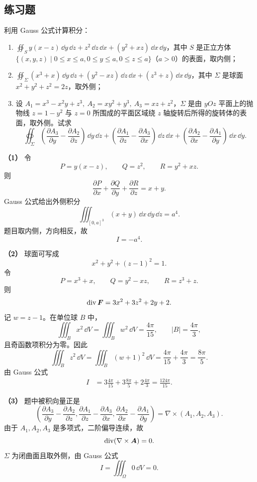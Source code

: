 \subsection{练习题}

\begin{xexercise}[1]
利用 Gauss 公式计算积分：
\begin{enumerate}[label=(\arabic*)]
\item $\displaystyle\oiint_S y(x-z)\,\dd y\,\dd z+z^2\,\dd z\,\dd x+(y^2+xz)\,\dd x\,\dd y$，其中 $S$ 是正立方体 $\{(x,y,z)\mid0\le x\le a,0\le y\le a,0\le z\le a\}$（$a>0$）的表面，取内侧；
\item $\displaystyle\oiint_\Sigma(x^3+x)\,\dd y\,\dd z+(y^2-xz)\,\dd z\,\dd x+(z^3+z)\,\dd x\,\dd y$，其中 $\Sigma$ 是球面 $x^2+y^2+z^2=2z$，取外侧；
\item 设 $A_1=x^3-x^2y+z^3,\ A_2=xy^2+y^3,\ A_3=xz+z^2$，$\Sigma$ 是由 $yOz$ 平面上的抛物线 $z=1-y^2$ 与 $z=0$ 所围成的平面区域绕 $z$ 轴旋转后所得的旋转体的表面，取外侧。试求
\[
  \oiint_\Sigma\left(\frac{\partial A_3}{\partial y}-\frac{\partial A_2}{\partial z}\right)\,\dd y\,\dd z
  +\left(\frac{\partial A_1}{\partial z}-\frac{\partial A_3}{\partial x}\right)\,\dd z\,\dd x
  +\left(\frac{\partial A_2}{\partial x}-\frac{\partial A_1}{\partial y}\right)\,\dd x\,\dd y.
\]
\end{enumerate}
\end{xexercise}
\begin{xsolution}
\textbf{（1）}\quad
令
\[
P=y(x-z),\qquad Q=z^2,
\qquad R=y^2+xz.
\]
则
\[
  \frac{\partial P}{\partial x}+\frac{\partial Q}{\partial y}+\frac{\partial R}{\partial z}=x+y.
\]
Gauss 公式给出外侧积分
\[
  \iiint_{[0,a]^3}(x+y)\,\dd x\,\dd y\,\dd z=a^4.
\]
题目取内侧，方向相反，故
\[
  \boxed{I=-a^4}.
\]

\textbf{（2）}\quad
球面可写成
\[
  x^2+y^2+(z-1)^2=1.
\]
令
\[
P=x^3+x,\qquad Q=y^2-xz,\qquad R=z^3+z.
\]
则
\[
  \operatorname{div}\bm{F}=3x^2+3z^2+2y+2.
\]
记 $w=z-1$。在单位球 $B$ 中，
\[
  \iiint_Bx^2\,\dd V=\iiint_Bw^2\,\dd V=\frac{4\pi}{15},
  \qquad |B|=\frac{4\pi}{3},
\]
且奇函数项积分为零。因此
\[
  \iiint_Bz^2\,\dd V
  =\iiint_B(w+1)^2\,\dd V
  =\frac{4\pi}{15}+\frac{4\pi}{3}=\frac{8\pi}{5}.
\]
由 Gauss 公式
\begin{align*}
I
&=3\frac{4\pi}{15}+3\frac{8\pi}{5}+2\frac{4\pi}{3}
=\frac{124\pi}{15}.
\end{align*}

\textbf{（3）}\quad
题中被积向量正是
\[
  \left(
  \frac{\partial A_3}{\partial y}-\frac{\partial A_2}{\partial z},
  \frac{\partial A_1}{\partial z}-\frac{\partial A_3}{\partial x},
  \frac{\partial A_2}{\partial x}-\frac{\partial A_1}{\partial y}
  \right)=\nabla\times(A_1,A_2,A_3).
\]
由于 $A_1,A_2,A_3$ 是多项式，二阶偏导连续，故
\[
  \operatorname{div}(\nabla\times\bm{A})=0.
\]
$\Sigma$ 为闭曲面且取外侧，由 Gauss 公式
\[
  \boxed{I=\iiint_\Omega0\,\dd V=0}.
\]
\end{xsolution}


